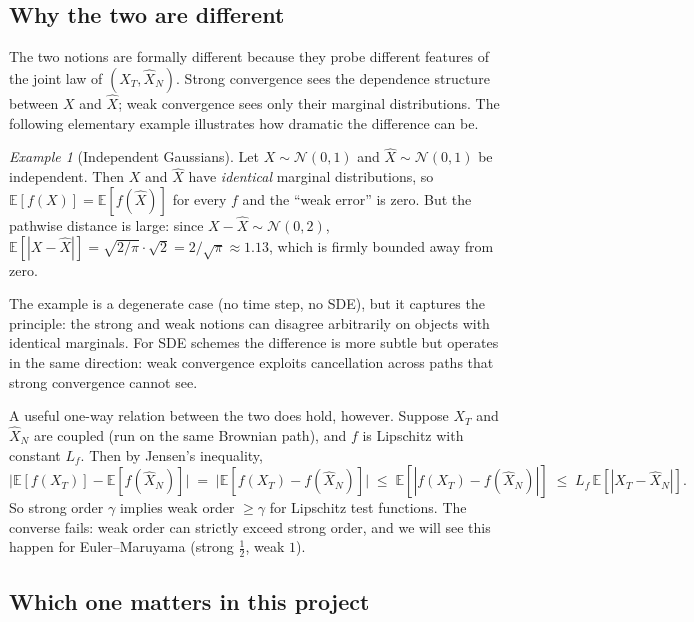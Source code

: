 \documentclass[11pt,a4paper]{article}
\theoremstyle{plain}
\theoremstyle{definition}
\theoremstyle{remark}
\newtheorem{example}[theorem]{Example}
\newcommand{\E}{\mathbb{E}}
\begin{document}
\subsection{Why the two are different}

The two notions are formally different because they probe different
features of the joint law of $(X_T, \hat X_N)$. Strong convergence
sees the dependence structure between $X$ and $\hat X$; weak
convergence sees only their marginal distributions. The following
elementary example illustrates how dramatic the difference can be.

\begin{example}[Independent Gaussians]
\label{ex:indep-gauss}
Let $X \sim \mathcal{N}(0, 1)$ and $\hat X \sim \mathcal{N}(0, 1)$ be
independent. Then $X$ and $\hat X$ have \emph{identical} marginal
distributions, so $\E[f(X)] = \E[f(\hat X)]$ for every $f$ and the
``weak error'' is zero. But the pathwise distance is large: since
$X - \hat X \sim \mathcal{N}(0, 2)$,
$\E[|X - \hat X|] = \sqrt{2/\pi} \cdot \sqrt{2} = 2/\sqrt{\pi} \approx 1.13$,
which is firmly bounded away from zero.
\end{example}

The example is a degenerate case (no time step, no SDE), but it
captures the principle: the strong and weak notions can disagree
arbitrarily on objects with identical marginals. For SDE schemes the
difference is more subtle but operates in the same direction: weak
convergence exploits cancellation across paths that strong
convergence cannot see.

A useful one-way relation between the two does hold, however. Suppose
$X_T$ and $\hat X_N$ are coupled (run on the same Brownian path), and
$f$ is Lipschitz with constant $L_f$. Then by Jensen's inequality,
\begin{equation}
\label{eq:weak-lip-strong}
\big| \E[f(X_T)] - \E[f(\hat X_N)] \big|
\;=\; \big| \E[f(X_T) - f(\hat X_N)] \big|
\;\leq\; \E[|f(X_T) - f(\hat X_N)|]
\;\leq\; L_f\, \E[|X_T - \hat X_N|].
\end{equation}
So strong order $\gamma$ implies weak order $\geq \gamma$ for
Lipschitz test functions. The converse fails: weak order can strictly
exceed strong order, and we will see this happen for Euler--Maruyama
(strong $\tfrac{1}{2}$, weak $1$).

\subsection{Which one matters in this project}
\end{document}
